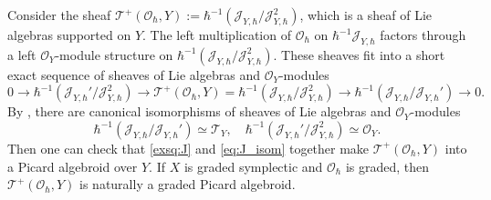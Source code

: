\documentclass[11pt, a4paper]{amsart}
\newcommand{\J}{\mathcal{J}}
\newcommand{\hb}{\hbar}
\newcommand{\T}{\mathcal{T}}
\newcommand{\TT}{\mathscr{T}}
\newcommand{\tatp}{\TT^+(\Q, Y)}
\newcommand{\tat}{\TT(\Q,Y)}
\newcommand{\OO}{\mathcal{O}}
\newcommand{\Q}{\OO_\hb}
\theoremstyle{definition}
\numberwithin{equation}{section}
\begin{document}
Consider the sheaf $\tatp := \hb^{-1} (\J_{Y,\hb}/\J_{Y,\hb}^2)$, which is a sheaf of Lie algebras supported on $Y$. The left multiplication of $\OO_\hb$ on $\hb^{-1}\J_{Y,\hb}$ factors through a left $\OO_Y$-module structure on $\hb^{-1} (\J_{Y,\hb}/ \J_{Y,\hb}^2)$. These sheaves fit into a short exact sequence of sheaves of Lie algebras and $\OO_Y$-modules
\begin{equation}\label{exsq:J}
	0 \to \hb^{-1} (\J_{Y,\hb}' / \J_{Y,\hb}^2) \to \tatp = \hb^{-1} (\J_{Y,\hb}/ \J_{Y,\hb}^2) \to \hb^{-1} (\J_{Y,\hb} / \J_{Y,\hb}') \to 0.
\end{equation}
By \cite[Lemma 5.4]{BGKP}, there are canonical isomorphisms of sheaves of Lie algebras and $\OO_Y$-modules
\begin{equation} \label{eq:J_isom}
	\hb^{-1} (\J_{Y,\hb} / \J_{Y,\hb}') \simeq \T_Y, \quad \hb^{-1} (\J_{Y,\hb}' / \J_{Y,\hb}^2) \simeq \OO_Y.
\end{equation}
Then one can check that \eqref{exsq:J} and \eqref{eq:J_isom} together make $\tatp$ into a Picard algebroid over $Y$. If $X$ is graded symplectic and $\OO_\hb$ is graded, then $\tatp$ is naturally a graded Picard algebroid.

\end{document}
